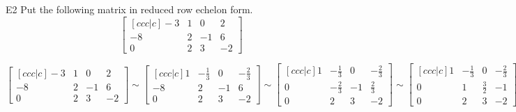 \begin{problem}{E2}
Put the following matrix in reduced row echelon form.
$$\begin{bmatrix}[ccc|c] -3 & 1 & 0 & 2 \\ -8 & 2 & -1 & 6 \\ 0 & 2 & 3 & -2 \end{bmatrix}$$
\end{problem}
\begin{solution}
$$\begin{bmatrix}[ccc|c] 
-3 & 1 & 0 & 2 \\
 -8 & 2 & -1 & 6 \\
 0 & 2 & 3 & -2 
\end{bmatrix} \sim
\begin{bmatrix}[ccc|c] 
1 & -\frac{1}{3} & 0 & -\frac{2}{3} \\
 -8 & 2 & -1 & 6 \\
 0 & 2 & 3 & -2 
\end{bmatrix} \sim
\begin{bmatrix}[ccc|c] 
1 & -\frac{1}{3} & 0 & -\frac{2}{3} \\
 0 & -\frac{2}{3} & -1 & \frac{2}{3} \\
 0 & 2 & 3 & -2 
\end{bmatrix} \sim
\begin{bmatrix}[ccc|c] 
1 & -\frac{1}{3} & 0 & -\frac{2}{3} \\
 0 & 1 & \frac{3}{2} & -1 \\
 0 & 2 & 3 & -2 
\end{bmatrix} \sim
\begin{bmatrix}[ccc|c] 
1 & 0 & \frac{1}{2} & -1 \\
 0 & 1 & \frac{3}{2} & -1 \\
 0 & 0 & 0 & 0 
\end{bmatrix}$$
\end{solution}

